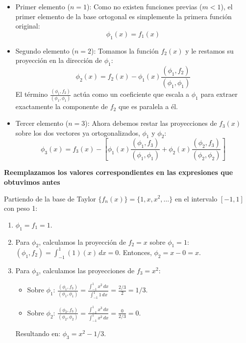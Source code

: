\documentclass[a4paper]{article}
\begin{document}
\begin{itemize}
    \item Primer elemento ($n=1$):
    Como no existen funciones previas ($m < 1$), el primer elemento de la base ortogonal es simplemente la primera función original:
    $$\phi_1(x) = f_1(x)$$

    \item Segundo elemento ($n=2$):
    Tomamos la función $f_2(x)$ y le restamos su proyección en la dirección de $\phi_1$:
    $$\phi_2(x) = f_2(x) - \phi_1(x) \frac{(\phi_1, f_2)}{(\phi_1, \phi_1)}$$
    El término $\frac{(\phi_1, f_2)}{(\phi_1, \phi_1)}$ actúa como un coeficiente que escala a $\phi_1$ para extraer exactamente la componente de $f_2$ que es paralela a él.

    \item Tercer elemento ($n=3$):
    Ahora debemos restar las proyecciones de $f_3(x)$ sobre los dos vectores ya ortogonalizados, $\phi_1$ y $\phi_2$:
    $$\phi_3(x) = f_3(x) - \left[ \phi_1(x) \frac{(\phi_1, f_3)}{(\phi_1, \phi_1)} + \phi_2(x) \frac{(\phi_2, f_3)}{(\phi_2, \phi_2)} \right]$$
\end{itemize}

\textbf{Reemplazamos los valores correspondientes en las expresiones que obtuvimos antes}

Partiendo de la base de Taylor $\{f_n(x)\} = \{1, x, x^2, \dots\}$ en el intervalo $[-1, 1]$ con peso 1:

\begin{enumerate}
    \item $\phi_1 = f_1 = 1$.
    
    \item Para $\phi_2$, calculamos la proyección de $f_2=x$ sobre $\phi_1=1$:
    $(\phi_1, f_2) = \int_{-1}^{1} (1)(x)\, dx = 0$.
    Entonces, $\phi_2 = x - 0 = x$.
    
    \item Para $\phi_3$, calculamos las proyecciones de $f_3=x^2$:
    \begin{itemize}
        \item Sobre $\phi_1$: $\frac{(\phi_1, f_3)}{(\phi_1, \phi_1)} = \frac{\int_{-1}^1 x^2\, dx}{\int_{-1}^1 1\, dx} = \frac{2/3}{2} = 1/3$.
        \item Sobre $\phi_2$: $\frac{(\phi_2, f_3)}{(\phi_2, \phi_2)} = \frac{\int_{-1}^1 x^3\, dx}{\int_{-1}^1 x^2\, dx} = \frac{0}{2/3} = 0$.
    \end{itemize}
    Resultando en: $\phi_3 = x^2 - 1/3$.
\end{enumerate}
\end{document}
